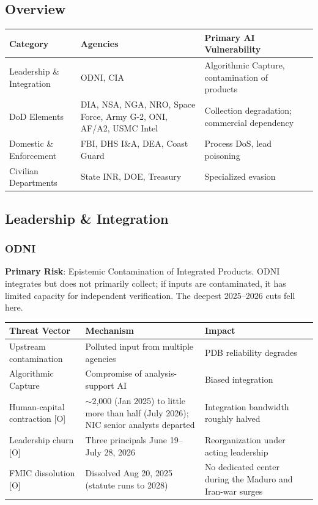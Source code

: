 \documentclass[11pt,letterpaper]{article}
\begin{document}
\subsection{Overview}

\begin{center}
\small
\begin{tabularx}{\linewidth}{ZY{0.83}Y{1.06}Y{1.11}}
\toprule
\textbf{Category} & \textbf{Agencies} & \textbf{Primary AI Vulnerability} \\
\midrule
Leadership \& Integration & ODNI, CIA & Algorithmic Capture, contamination of products \\
DoD Elements & DIA, NSA, NGA, NRO, Space Force, Army G-2, ONI, AF/A2, USMC Intel & Collection degradation; commercial dependency \\
Domestic \& Enforcement & FBI, DHS I\&A, DEA, Coast Guard & Process DoS, lead poisoning \\
Civilian Departments & State INR, DOE, Treasury & Specialized evasion \\
\bottomrule
\end{tabularx}
\end{center}

\subsection{Leadership \& Integration}

\subsubsection{ODNI}

\textbf{Primary Risk}: Epistemic Contamination of Integrated Products. ODNI integrates but does not primarily collect; if inputs are contaminated, it has limited capacity for independent verification. The deepest 2025--2026 cuts fell here.

\begin{center}
\small
\begin{tabularx}{\linewidth}{ZY{0.78}Y{1.2}Y{1.02}}
\toprule
\textbf{Threat Vector} & \textbf{Mechanism} & \textbf{Impact} \\
\midrule
Upstream contamination & Polluted input from multiple agencies & PDB reliability degrades \\
Algorithmic Capture & Compromise of analysis-support AI & Biased integration \\
Human-capital contraction [O] & $\sim$2,000 (Jan 2025) to little more than half (July 2026); NIC senior analysts departed & Integration bandwidth roughly halved \\
Leadership churn [O] & Three principals June 19--July 28, 2026 & Reorganization under acting leadership \\
FMIC dissolution [O] & Dissolved Aug 20, 2025 (statute runs to 2028) & No dedicated center during the Maduro and Iran-war surges \\
\bottomrule
\end{tabularx}
\end{center}
\end{document}
